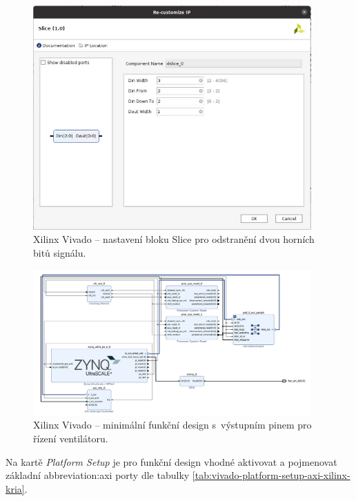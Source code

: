 \documentclass[a4paper, twoside, 11pt]{article}
\begin{document}
				\begin{figure}[htbp!]
					\centering
					\includegraphics[width=0.95\textwidth]{src/png/kr26-xilinx-vivado-flow/kr26-xilix-vivado-flow-29.jpg}
					\caption{Xilinx Vivado – nastavení bloku Slice pro odstranění dvou horních bitů signálu.}
					\label{fig:kr26-xilix-vivado-flow-29}
				\end{figure}

				\begin{figure}[htbp!]
					\centering
					\includegraphics[width=0.95\textwidth]{src/png/kr26-xilinx-vivado-flow/kr26-xilix-vivado-flow-31.jpg}
					\caption{Xilinx Vivado – minimální funkční design s~výstupním pinem pro řízení ventilátoru.}
					\label{fig:kr26-xilix-vivado-flow-31}
				\end{figure}


				Na kartě \textit{Platform Setup} je pro funkční design vhodné aktivovat a pojmenovat základní \gls{abbreviation:axi} porty dle tabulky \ref{tab:vivado-platform-setup-axi-xilinx-kria}.
\end{document}
